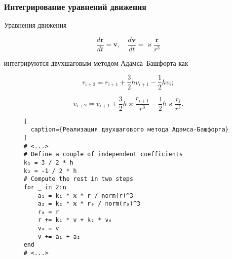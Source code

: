 \begin{frame}
\frametitle{Интегрирование уравнений движения}

Уравнения движения

\su
\begin{equation}
  \frac{d\mathbf{r}}{dt} = \mathbf{v}, \quad \frac{d \mathbf{v}}{dt} = \varkappa \frac{\mathbf{r}}{r^3}
\end{equation}

интегрируются двухшаговым методом Адамса--Башфорта как

\su
\begin{equation}
  r_{i+2} = r_{i+1} + \frac{3}{2} h v_{i+1} - \frac{1}{2} h v_i;
\end{equation}

\su
\begin{equation}
  v_{i+2} = v_{i+1} + \frac{3}{2} h \varkappa \frac{r_{i+1}}{r^3} - \frac{1}{2} h \varkappa \frac{r_i}{r^3}.
\end{equation}

\end{frame}

\captionsetup{singlelinecheck=false, justification=justified}

\begin{frame}[fragile]

\begin{figure}[h!]
\begin{lstlisting}[
  caption={Реализация двухшагового метода Адамса-Башфорта}
]
# <...>
# Define a couple of independent coefficients
k₁ = 3 / 2 * h
k₂ = -1 / 2 * h
# Compute the rest in two steps
for _ in 2:n
    a₁ = k₁ * ϰ * r / norm(r)^3
    a₂ = k₂ * ϰ * r₀ / norm(r₀)^3
    r₀ = r
    r += k₁ * v + k₂ * v₀
    v₀ = v
    v += a₁ + a₂
end
# <...>
\end{lstlisting}
\end{figure}

\end{frame}

\captionsetup{justification=centering}

